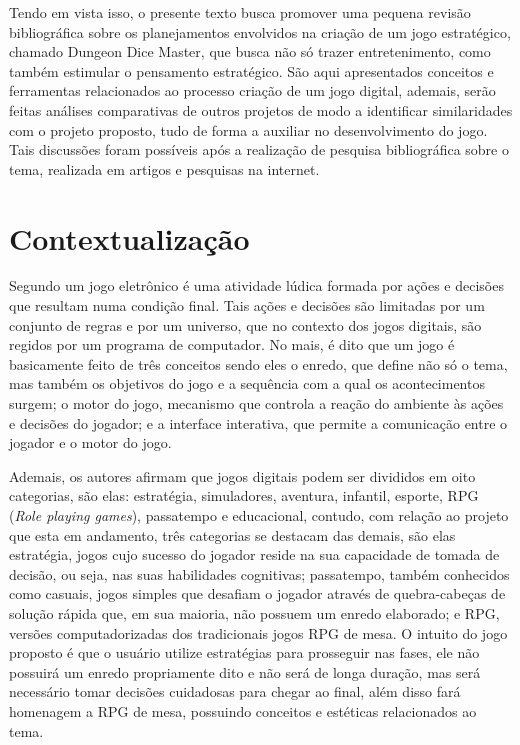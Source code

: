 \documentclass[12pt]{article}
\begin{document}
Tendo em vista isso, o presente texto busca promover uma pequena revisão bibliográfica sobre os planejamentos envolvidos na criação de um jogo estratégico, chamado Dungeon Dice Master, que busca não só trazer entretenimento, como também estimular o pensamento estratégico. São aqui apresentados conceitos e ferramentas relacionados ao processo criação de um jogo digital, ademais, serão feitas análises comparativas de outros projetos de modo a identificar similaridades com o projeto proposto, tudo de forma a auxiliar no desenvolvimento do jogo. Tais discussões foram possíveis após a realização de pesquisa bibliográfica sobre o tema, realizada em artigos e pesquisas na internet.


\section{Contextualização}

Segundo \cite{lucchese2009conceituaccao} um jogo eletrônico é uma atividade lúdica formada por ações e decisões que resultam numa condição final. Tais ações e decisões são limitadas por um conjunto de regras e por um universo, que no contexto dos jogos digitais, são regidos por um programa de computador. No mais, é dito que um jogo é basicamente feito de três conceitos sendo eles o enredo, que define não só o tema, mas também os objetivos do jogo e a sequência com a qual os acontecimentos surgem; o motor do jogo, mecanismo que controla a reação do ambiente às ações e decisões do jogador; e a interface interativa, que permite a comunicação entre o jogador e o motor do jogo.

Ademais, os autores afirmam que jogos digitais podem ser divididos em oito categorias, são elas: estratégia, simuladores, aventura, infantil, esporte, RPG (\emph{Role playing games}), passatempo e educacional, contudo, com relação ao projeto que esta em andamento, três categorias se destacam das demais, são elas estratégia, jogos cujo sucesso do jogador reside na sua capacidade de tomada de decisão, ou seja, nas suas habilidades cognitivas; passatempo, também conhecidos como casuais, jogos simples que desafiam o jogador através de quebra-cabeças de solução rápida que, em sua maioria, não possuem um enredo elaborado; e RPG, versões computadorizadas dos tradicionais jogos RPG de mesa. O intuito do jogo proposto é que o usuário utilize estratégias para prosseguir nas fases, ele não possuirá um enredo propriamente dito e não será de longa duração, mas será necessário tomar decisões cuidadosas para chegar ao final, além disso fará homenagem a RPG de mesa, possuindo conceitos e estéticas relacionados ao tema.
\end{document}
